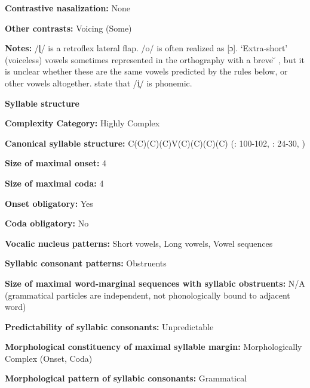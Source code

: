 \textbf{Contrastive nasalization:} None



\textbf{Other contrasts:} Voicing (Some)



\textbf{Notes:} /ɭ/ is a retroflex lateral flap. /o/ is often realized as [ɔ]. ‘Extra-short’ (voiceless) vowels sometimes represented in the orthography with a breve  \u{} , but it is unclear whether these are the same vowels predicted by the rules below, or other vowels altogether.    \citet[236]{DoloresMathiot1991} state that /i̥/ is phonemic.



\textbf{Syllable structure}



\textbf{Complexity Category:} Highly Complex



\textbf{Canonical syllable structure:} C(C)(C)(C)V(C)(C)(C)(C) (\citealt{Saxton1982}: 100-102, \citealt{Hale1959}: 24-30, \citealt{HillZepeda1992})



\textbf{Size of maximal onset:} 4



\textbf{Size of maximal coda:} 4



\textbf{Onset obligatory:} Yes



\textbf{Coda obligatory:} No



\textbf{Vocalic nucleus patterns:} Short vowels, Long vowels, Vowel sequences



\textbf{Syllabic consonant patterns:} Obstruents



\textbf{Size of maximal word{}-marginal sequences with syllabic obstruents:} N/A (grammatical particles are independent, not phonologically bound to adjacent word)



\textbf{Predictability of syllabic consonants:} Unpredictable



\textbf{Morphological constituency of maximal syllable margin:} Morphologically Complex (Onset, Coda)



\textbf{Morphological pattern of syllabic consonants:} Grammatical




